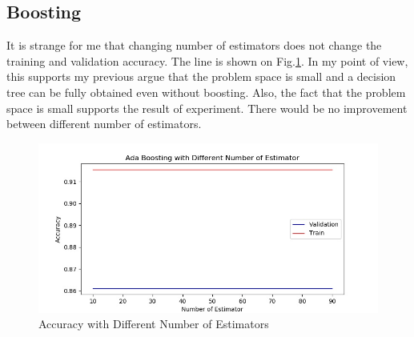 \documentclass[11pt]{article}
\begin{document}
\subsection{Boosting}
It is strange for me that changing number of estimators does not change the training and validation accuracy. The line is shown on Fig.\ref{fig:wine_ada}. In my point of view, this supports my previous argue that the problem space is small and a decision tree can be fully obtained even without boosting. Also, the fact that the problem space is small supports the result of experiment. There would be no improvement between different number of estimators.
\begin{figure}[h!]
  \includegraphics[width=\linewidth]{./wine/ada_num_estimator.jpg}
  \caption{Accuracy with Different Number of Estimators}
  \label{fig:wine_ada}
\end{figure}\\
\end{document}
